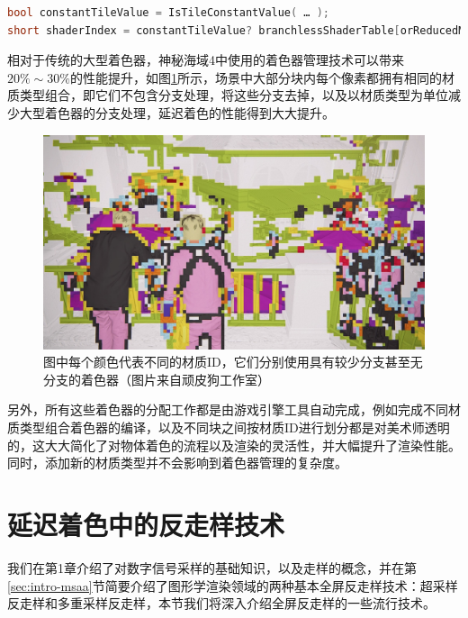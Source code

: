 \begin{lstlisting}[language=C++]
bool constantTileValue = IsTileConstantValue( … );
short shaderIndex = constantTileValue? branchlessShaderTable[orReducedMaskBits]: shaderTable[orReducedMaskBits];
\end{lstlisting}

相对于传统的大型着色器，神秘海域4中使用的着色器管理技术可以带来$20\%\sim 30\%$的性能提升，如图\ref{f:shade-material-ID}所示，场景中大部分块内每个像素都拥有相同的材质类型组合，即它们不包含分支处理，将这些分支去掉，以及以材质类型为单位减少大型着色器的分支处理，延迟着色的性能得到大大提升。

\begin{figure}
	\includegraphics[width=1.0\textwidth]{figures/shade/material-ID}
	\caption{图中每个颜色代表不同的材质ID，它们分别使用具有较少分支甚至无分支的着色器（图片来自顽皮狗工作室）}
	\label{f:shade-material-ID}
\end{figure}

另外，所有这些着色器的分配工作都是由游戏引擎工具自动完成，例如完成不同材质类型组合着色器的编译，以及不同块之间按材质ID进行划分都是对美术师透明的，这大大简化了对物体着色的流程以及渲染的灵活性，并大幅提升了渲染性能。同时，添加新的材质类型并不会影响到着色器管理的复杂度。





\section{延迟着色中的反走样技术}\label{sec:shade-anti-aliasing}
我们在第1章介绍了对数字信号采样的基础知识，以及走样的概念，并在第\ref{sec:intro-msaa}节简要介绍了图形学渲染领域的两种基本全屏反走样技术：超采样反走样和多重采样反走样，本节我们将深入介绍全屏反走样的一些流行技术。


